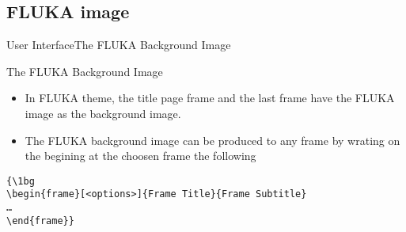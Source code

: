 \documentclass[10pt]{beamer}
\begin{document}
\subsection{FLUKA image}
\begin{frame}{User Interface}{The FLUKA Background Image}

\begin{block}{The FLUKA Background Image}
    \begin{itemize}
    \item In FLUKA theme, the title page frame and the last frame have the FLUKA image as the background image.
    \item The FLUKA background image can be produced to any frame by wrating on the begining at the choosen frame the following
    \end{itemize}

    \vspace{5pt}

  {\tt \{\textbackslash 1bg\\
    \textbackslash begin\{frame\}[<options>]\{Frame Title\}\{Frame Subtitle\}\\
    \ldots\\
    \textbackslash end\{frame\}\}}
\end{block}
\end{frame}


{\1
\begin{frame}
\end{frame}}
\end{document}
